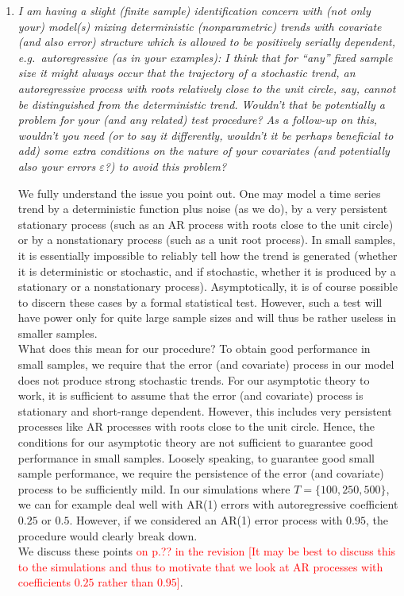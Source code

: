 \documentclass[a4paper,12pt]{article}
\begin{document}
\begin{enumerate}[label=\arabic*.,leftmargin=0.6cm]
\item \textit{I am having a slight (finite sample) identification concern with (not only your) model(s) mixing deterministic (nonparametric) trends with covariate (and also error) structure which is allowed to be positively serially dependent, e.g.\ autoregressive (as in your examples): I think that for ``any'' fixed sample size it might always occur that the trajectory of a stochastic trend, an autoregressive process with roots relatively close to the unit circle, say, cannot be distinguished from the deterministic trend. Wouldn't that be potentially a problem for your (and any related) test procedure? As a follow-up on this, wouldn't you need (or to say it differently, wouldn't it be perhaps beneficial to add) some extra conditions on the nature of your covariates (and potentially also your errors $\varepsilon$?) to avoid this problem?}


We fully understand the issue you point out. One may model a time series trend by a deterministic function plus noise (as we do), by a very persistent stationary process (such as an AR process with roots close to the unit circle) or by a nonstationary process (such as a unit root process). In small samples, it is essentially impossible to reliably tell how the trend is generated (whether it is deterministic or stochastic, and if stochastic, whether it is produced by a stationary or a nonstationary process). Asymptotically, it is of course possible to discern these cases by a formal statistical test. However, such a test will have power only for quite large sample sizes and will thus be rather useless in smaller samples. \\
What does this mean for our procedure? To obtain good performance in small samples, we require that the error (and covariate) process in our model does not produce strong stochastic trends. For our asymptotic theory to work, it is sufficient to assume that the error (and covariate) process is stationary and short-range dependent. However, this includes very persistent processes like AR processes with roots close to the unit circle. Hence, the conditions for our asymptotic theory are not sufficient to guarantee good performance in small samples. Loosely speaking, to guarantee good small sample performance, we require the persistence of the error (and covariate) process to be sufficiently mild. In our simulations where $T=\{100,250,500\}$, we can for example deal well with AR(1) errors with autoregressive coefficient $0.25$ or $0.5$. However, if we considered an AR(1) error process with $0.95$, the procedure would clearly break down. \\
We discuss these points \textcolor{red}{on p.?? in the revision [It may be best to discuss this to the simulations and thus to motivate that we look at AR processes with coefficients $0.25$ rather than $0.95$]}.



\end{enumerate}
\end{document}

